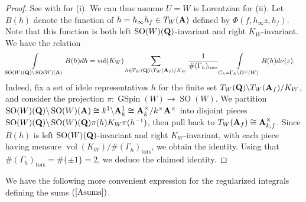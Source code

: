 \documentclass{amsart}
\theoremstyle{definition}
\theoremstyle{definition}
\theoremstyle{definition}
\begin{document}
\begin{proof} See \cite[Lemma 2.13]{Sch} with \cite[Lemma 4.4]{BY} for (i). We can thus assume $U =W$ is Lorentzian for (ii).
Let $B(h)$ denote the function of $h  = h_{\infty} h_f \in T_W({\bf{A}})$ defined by $\Phi(f, h_{\infty} z, h_f)$. Note that this function 
is both left $\operatorname{SO}(W)({\bf{Q}})$-invariant and right $K_W$-invariant. We have the relation 
\begin{align*} \int\limits_{ \operatorname{SO}(W)({\bf{Q}}) \backslash \operatorname{SO}(W)({\bf{A}})  } B(h)dh &= 
\operatorname{vol}(K_W) \sum\limits_{  h \in T_W({\bf{Q}}) \backslash T_W({\bf{A}}_f)/ K_W  } \frac{1}{\#(\Gamma_h)_{\operatorname{tors}}} 
\int\limits_{C_h = \Gamma_h \backslash D^{\pm}(W)} B(h) d \nu(z). \end{align*} 
Indeed, fix a set of idele representatives $h$ for the finite set $T_W({\bf{Q}}) \backslash T_W({\bf{A}}_f)/K_W$, and 
consider the projection $\pi: \operatorname{GSpin}(W) \rightarrow \operatorname{SO}(W)$. 
We partition $\operatorname{SO}(W)({\bf{Q}}) \backslash \operatorname{SO}(W)({\bf{A}}) \cong k^1 \backslash {\bf{A}}_k^1 \cong {\bf{A}}_k^{\times} / k^{\times} {\bf{A}}^{\times}$
into disjoint pieces $\operatorname{SO}(W)({\bf{Q}}) \backslash \operatorname{SO}(W)({\bf{Q}}) \pi(h) K_W \pi(h^{-1})$,
then pull back to $T_W({\bf{A}}_f)  \cong {\bf{A}}_{k, f}^{\times} $. Since $B(h)$ is left $\operatorname{SO}(W)({\bf{Q}})$-invariant
and right $K_W$-invariant, with each piece having measure $\operatorname{vol}(K_W)/\#(\Gamma_h)_{\operatorname{tors}}$, we obtain the identity. 
Using that $\#(\Gamma_h)_{\operatorname{tors}} = \# \lbrace \pm 1 \rbrace =2$, we deduce the claimed identity. \end{proof}

We have the following more convenient expression for the regularized integrals defining the sums $(\ref{Asums})$.
\end{document}
